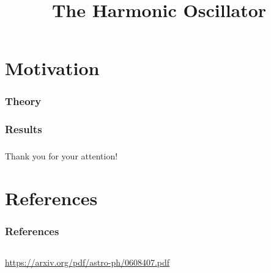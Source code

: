 \documentclass[aspectratio=169]{beamer}
\title[Xenon1T]{The Harmonic Oscillator}
\author[]{}
\date{\printdate{24.03.2020}} %
\institute{Computational Physicx}
\begin{document}
\begin{frame}
	\titlepage
\end{frame}


\section{Motivation}
\begin{frame}

\end{frame}

\begin{frame}
\frametitle{Theory}

\end{frame}

\begin{frame}
\frametitle{Results}

\end{frame}


\begin{frame}
\frametitle{}
\begin{center}
	Thank you for your attention!
\end{center}
\end{frame}

\section{References}
\begin{frame}
\frametitle{References}
\vspace{-20px}
\begin{columns}[T]
	\begin{column}{0.35\textwidth}
		\begin{tiny}
			\begin{thebibliography}{99}
				\fontsize{6}{6}
				\url{https://arxiv.org/pdf/astro-ph/0608407.pdf}
			\end{thebibliography}
		\end{tiny}
	\end{column}
\end{columns}
\end{frame}



\appendixstyle

\appendix
\end{document}
